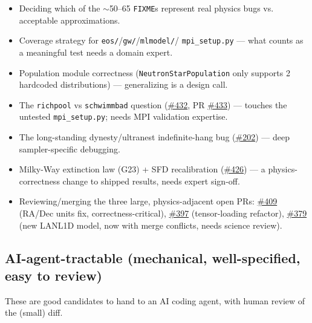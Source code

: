 \documentclass[10pt]{article}
\newcommand{\code}[1]{\texttt{#1}}
\begin{document}
\begin{itemize}
\item Deciding which of the $\sim$50--65 \code{FIXME}s represent real physics bugs
  vs. acceptable approximations.
\item Coverage strategy for \code{eos/}/\code{gw/}/\code{mlmodel/}/
  \code{mpi\_setup.py} --- what counts as a meaningful test needs a domain expert.
\item Population module correctness (\code{NeutronStarPopulation} only supports 2
  hardcoded distributions) --- generalizing is a design call.
\item The \code{richpool} vs \code{schwimmbad} question (\href{https://github.com/nuclear-multimessenger-astronomy/nmma/issues/432}{\#432}, PR \href{https://github.com/nuclear-multimessenger-astronomy/nmma/issues/433}{\#433}) ---
  touches the untested \code{mpi\_setup.py}; needs MPI validation expertise.
\item The long-standing dynesty/ultranest indefinite-hang bug (\href{https://github.com/nuclear-multimessenger-astronomy/nmma/issues/202}{\#202}) --- deep
  sampler-specific debugging.
\item Milky-Way extinction law (G23) + SFD recalibration (\href{https://github.com/nuclear-multimessenger-astronomy/nmma/issues/426}{\#426}) --- a
  physics-correctness change to shipped results, needs expert sign-off.
\item Reviewing/merging the three large, physics-adjacent open PRs: \href{https://github.com/nuclear-multimessenger-astronomy/nmma/issues/409}{\#409} (RA/Dec
  units fix, correctness-critical), \href{https://github.com/nuclear-multimessenger-astronomy/nmma/issues/397}{\#397} (tensor-loading refactor), \href{https://github.com/nuclear-multimessenger-astronomy/nmma/issues/379}{\#379} (new
  LANL1D model, now with merge conflicts, needs science review).
\end{itemize}

\subsection{AI-agent-tractable (mechanical, well-specified, easy to review)}
These are good candidates to hand to an AI coding agent, with human review of the
(small) diff.
\end{document}
